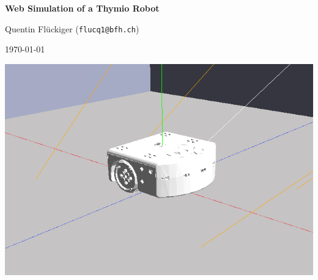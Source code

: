 \documentclass{scrbook}
\begin{document}
\begin{titlepage}
  \begin{center}
    {\LARGE \bfseries\sffamily Web Simulation of a Thymio Robot}

    \vspace{1cm}

    {\large Quentin Flückiger (\texttt{flucq1@bfh.ch})}
    \vspace{2mm}

    \today
    \vspace{2cm}

    \includegraphics[width=\textwidth]{./title}
  \end{center}
\end{titlepage}

\clearpage
\end{document}
